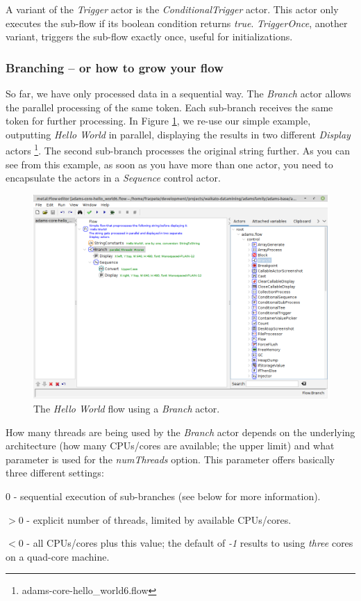 A variant of the \textit{Trigger} actor is the \textit{ConditionalTrigger}
actor. This actor only executes the sub-flow if its boolean condition returns
\textit{true}. \textit{TriggerOnce}, another variant, triggers the sub-flow 
exactly once, useful for initializations.

\subsubsection{Branching -- or how to grow your flow}
So far, we have only processed data in a sequential way. The \textit{Branch}
actor allows the parallel processing of the same token. Each sub-branch receives
the same token for further processing. In Figure
\ref{floweditor-helloworld-branch_flow}, we re-use our simple example,
outputting \textit{Hello World} in parallel, displaying the results in two
different \textit{Display} actors \footnote{adams-core-hello\_world6.flow}. The
second sub-branch processes the original string further. As you can see from this example, as soon as you have more than
one actor, you need to encapsulate the actors in a \textit{Sequence} control
actor.
\begin{figure}[htb]
  \centering
  \includegraphics[width=12.0cm]{images/floweditor-helloworld-branch_flow.png}
  \caption{The \textit{Hello World} flow using a \textit{Branch} actor.}
  \label{floweditor-helloworld-branch_flow}
\end{figure}
How many threads are being used by the \textit{Branch} actor depends on the
underlying architecture (how many CPUs/cores are available; the upper limit)
and what parameter is used for the \textit{numThreads} option. This parameter
offers basically three different settings:
\begin{tight_itemize}
  \item \textbf{$0$} - sequential execution of sub-branches (see below for more information).
  \item \textbf{$>0$} - explicit number of threads, limited by available CPUs/cores.
  \item \textbf{$<0$} - all CPUs/cores plus this value; the default of \textit{-1} results to
  using \textit{three} cores on a quad-core machine.
\end{tight_itemize}
